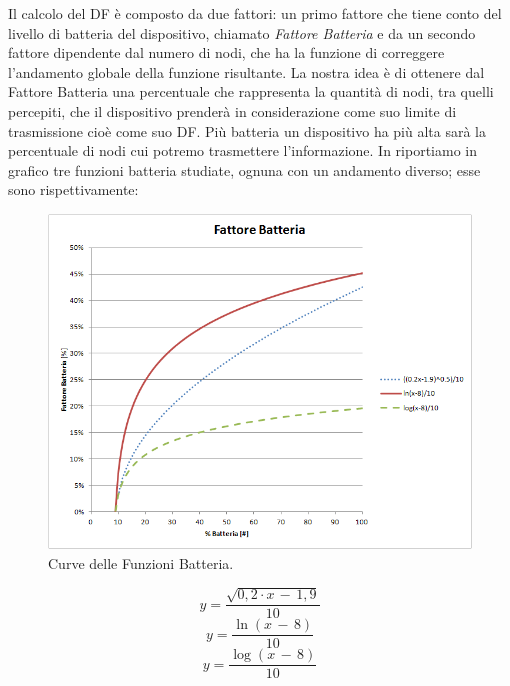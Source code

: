 Il calcolo del DF è composto da due fattori: un primo fattore che tiene conto del livello di batteria del dispositivo, chiamato \textit{Fattore Batteria} e da un secondo fattore dipendente dal numero di nodi, che ha la funzione di correggere l'andamento globale della funzione risultante. La nostra idea è di ottenere dal Fattore Batteria una percentuale che rappresenta la quantità di nodi, tra quelli percepiti, che il dispositivo prenderà in considerazione come suo limite di trasmissione cioè come suo DF. Più batteria un dispositivo ha più alta sarà la percentuale di nodi cui potremo trasmettere l'informazione. In  riportiamo in grafico tre funzioni batteria studiate, ognuna con un andamento diverso; esse sono rispettivamente:
\begin{figure}[tb]
	\centering
	\includegraphics[width=0.9\linewidth, keepaspectratio]{Images/grafici_usati/DF_battery_factor}
	\caption[DF fattore batteria.]{Curve delle Funzioni Batteria.}
	\label{fig:DF_battery_factor}
\end{figure}

\begin{equation}
	\label{eq:df_bat_radq}
	y=\dfrac{\sqrt{0,2\cdot x\,-\,1,9}}{10}
\end{equation}
\begin{equation}
	\label{eq:df_bat_ln}
	y=\dfrac{\ln\left(x\,-\,8\right) }{10}
\end{equation}
\begin{equation}
	\label{eq:df_bat_log}
	y=\dfrac{\log\left(x\,-\,8\right) }{10}
\end{equation}

